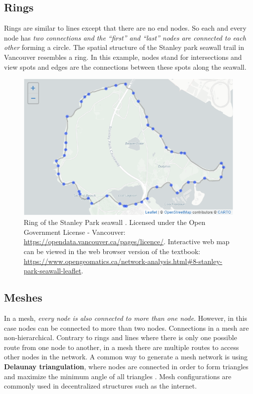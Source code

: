 \documentclass[
]{book}
\begin{document}
\subsection{Rings}\label{rings}

Rings are similar to lines except that there are no end nodes. So each and every node has \emph{two connections and the ``first'' and ``last'' nodes are connected to each other} forming a circle. The spatial structure of the Stanley park seawall trail in Vancouver resembles a ring. In this example, nodes stand for intersections and view spots and edges are the connections between these spots along the seawall.



\begin{figure}
\includegraphics[width=8.58in]{images/08-Ring-of-the-Stanley-Park-seawall-static} \caption{Ring of the Stanley Park seawall \citep{city_of_vancouver_open_nodate}. Licensed under the Open Government License - Vancouver: \url{https://opendata.vancouver.ca/pages/licence/}. Interactive web map can be viewed in the web browser version of the textbook: \url{https://www.opengeomatics.ca/network-analysis.html\#8-stanley-park-seawall-leaflet}.}\label{fig:8-stanley-park-seawall-leaflet}
\end{figure}

\subsection{Meshes}\label{meshes}

In a mesh, \emph{every node is also connected to more than one node}. However, in this case nodes can be connected to more than two nodes. Connections in a mesh are non-hierarchical. Contrary to rings and lines where there is only one possible route from one node to another, in a mesh there are multiple routes to access other nodes in the network. A common way to generate a mesh network is using \textbf{Delaunay triangulation}, where nodes are connected in order to form triangles and maximize the minimum angle of all triangles \citep{wikimedia_delaunay_2021}. Mesh configurations are commonly used in decentralized structures such as the internet.
\end{document}
